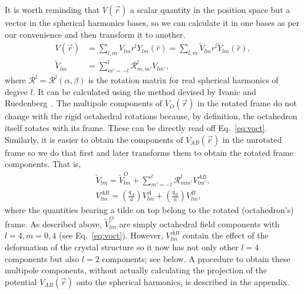 \documentclass[a4paper,prb,twocolumn]{revtex4-1}  %
\begin{document}
It is worth reminding that
$V(\vec r) $ a scalar quantity in the position space but a vector 
in the spherical harmonics bases, so
we can calculate it in one bases as per our convenience and then transform it to another.
\begin{align}
V(\vec r) &= \sum_{l,m} V_{lm} r^l Y_{lm}(\hat r)
= \sum_{l,m} \tilde V_{lm} r^l \tilde Y_{lm}(\hat r),\\
\tilde V_{lm} &= \sum_{m'=-l}^{l}\mathcal{R}^{l}_{m,m'}V_{lm'},
\end{align}
where 
$\mathcal{R}^{l}=\mathcal{R}^{l}(\alpha,\beta)$ is the rotation matrix for real spherical harmonics 
of degree $l$. %
It can be calculated using the method 
devised by Ivanic and Ruedenberg~\cite{IvanicJPC96}.
The multipole components of $V_O(\vec r)$ in the rotated frame do not change with the rigid octahedral rotations because, by definition, the octahedron itself rotates with its frame.
These can be directly read off Eq.~\ref{eq:voct}.
Similarly, it is easier to obtain the components of $V_{AB}(\vec r)$
in the unrotated frame so we do that first and later transforms them to obtain the rotated frame components.
That is,
\begin{gather}
\tilde V_{lm} = \tilde V_{lm}^O + \sum_{m'=-l}^{l}\mathcal{R}^{l}_{m m'} V_{lm'}^{AB},\\
V_{lm}^{AB} = \left(\frac{q_A}{a} \right)V_{lm}^{A}   
+ \left(\frac{q_B}{a}\right)V_{lm}^{B},
\end{gather}
where the quantities bearing a tilde on top belong to the rotated (octahedron's) frame.
As described above, 
$\tilde V_{lm}^O$ are simply octahedral field components 
with $l=4,m=0,4$ (see Eq.~\ref{eq:voct}).
However, $V_{lm}^{AB}$ contain the effect of the deformation of the crystal structure 
so it now has not only other $l=4$ components but also $l=2$ components; see below.
A procedure to obtain these multipole components, without
actually calculating the projection of the potential $V_{AB}(\vec r)$ 
onto the spherical harmonics, is described in the appendix. %
\end{document}

